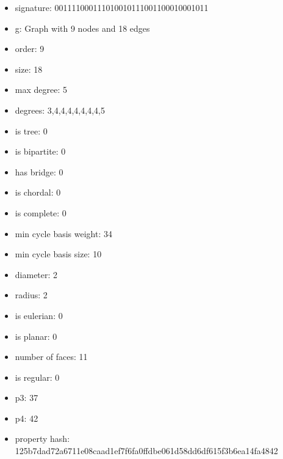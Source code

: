 \newpage
\begin{figure}
\end{figure}
\begin{itemize}
\item signature: 001111000111010010111001100010001011
\item g: Graph with 9 nodes and 18 edges
\item order: 9
\item size: 18
\item max degree: 5
\item degrees: 3,4,4,4,4,4,4,4,5
\item is tree: 0
\item is bipartite: 0
\item has bridge: 0
\item is chordal: 0
\item is complete: 0
\item min cycle basis weight: 34
\item min cycle basis size: 10
\item diameter: 2
\item radius: 2
\item is eulerian: 0
\item is planar: 0
\item number of faces: 11
\item is regular: 0
\item p3: 37
\item p4: 42
\item property hash: 125b7dad72a6711e08caad1ef7f6fa0ffdbe061d58dd6df615f3b6ea14fa4842
\end{itemize}
